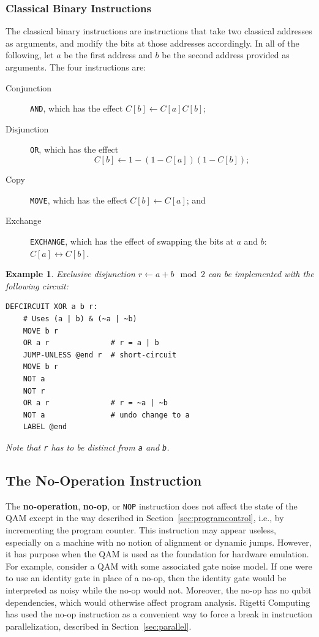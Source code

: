 \documentclass[conference]{IEEEtran}
\newcommand{\defn}[1]{\textbf{#1}}
\newtheorem{example}{Example}
\begin{document}
\subsubsection{Classical Binary Instructions}
The classical binary instructions are instructions that take two classical addresses as arguments, and modify the bits at those addresses accordingly. In all of the following, let $a$ be the first address and $b$ be the second address provided as arguments. The four instructions are:
\begin{description}
    \item[Conjunction] \verb|AND|, which has the effect $C[b] \leftarrow C[a]C[b]$;
    \item[Disjunction] \verb|OR|, which has the effect \[C[b] \leftarrow 1 - (1 - C[a])(1 - C[b]);\]
    \item[Copy] \verb|MOVE|, which has the effect $C[b] \leftarrow C[a]$; and
    \item[Exchange] \verb|EXCHANGE|, which has the effect of swapping the bits at $a$ and $b$: $C[a]\leftrightarrow C[b]$.
\end{description}

\begin{example}
Exclusive disjunction $r\leftarrow a+b\mod 2$ can be implemented with the following circuit:
\begin{verbatim}
DEFCIRCUIT XOR a b r:
    # Uses (a | b) & (~a | ~b)
    MOVE b r
    OR a r              # r = a | b
    JUMP-UNLESS @end r  # short-circuit
    MOVE b r
    NOT a
    NOT r
    OR a r              # r = ~a | ~b
    NOT a               # undo change to a
    LABEL @end    
\end{verbatim}
Note that \verb|r| has to be distinct from \verb|a| and \verb|b|.
\end{example}

\subsection{The No-Operation Instruction}

The \defn{no-operation}, \defn{no-op}, or \verb|NOP| instruction does not affect the state of the QAM except in the way described in Section~\ref{sec:programcontrol}, i.e., by incrementing the program counter. This instruction may appear useless, especially on a machine with no notion of alignment or dynamic jumps. However, it has purpose when the QAM is used as the foundation for hardware emulation. For example, consider a QAM with some associated gate noise model. If one were to use an identity gate in place of a no-op, then the identity gate would be interpreted as noisy while the no-op would not. Moreover, the no-op has no qubit dependencies, which would otherwise affect program analysis. Rigetti Computing has used the no-op instruction as a convenient way to force a break in instruction parallelization, described in Section~\ref{sec:parallel}.
\end{document}
